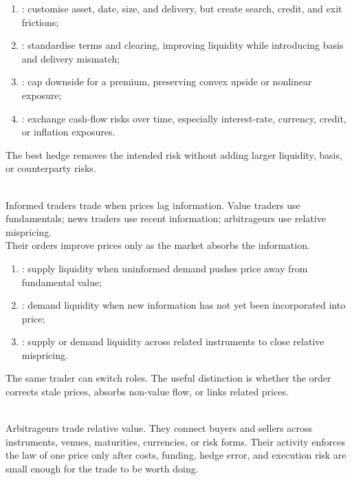 \documentclass[a4paper,oneside,openany]{book}
\begin{document}
\begin{taxonomy} 
\begin{enumerate}[label=\roman*.]
\setlength{\itemsep}{0pt}
\item {}: customise asset, date, size, and delivery, but create search, credit, and exit frictions;
\item {}: standardise terms and clearing, improving liquidity while introducing basis and delivery mismatch;
\item {}: cap downside for a premium, preserving convex upside or nonlinear exposure;
\item {}: exchange cash-flow risks over time, especially interest-rate, currency, credit, or inflation exposures.
\end{enumerate}
The best hedge removes the intended risk without adding larger liquidity, basis, or counterparty risks.
\end{taxonomy}

\begin{taxonomy} \\
Informed traders trade when prices lag information. Value traders use fundamentals; news traders use recent information; arbitrageurs use relative mispricing.\\
Their orders improve prices only as the market absorbs the information.
\end{taxonomy}

\begin{taxonomy} 
\begin{enumerate}[label=\roman*.]
\setlength{\itemsep}{0pt}
\item {}: supply liquidity when uninformed demand pushes price away from fundamental value;
\item {}: demand liquidity when new information has not yet been incorporated into price;
\item {}: supply or demand liquidity across related instruments to close relative mispricing.
\end{enumerate}
The same trader can switch roles. The useful distinction is whether the order corrects stale prices, absorbs non-value flow, or links related prices.
\end{taxonomy}

\begin{mechanism} \\
Arbitrageurs trade relative value. They connect buyers and sellers across instruments, venues, maturities, currencies, or risk forms. Their activity enforces the law of one price only after costs, funding, hedge error, and execution risk are small enough for the trade to be worth doing.
\end{mechanism}
\end{document}
